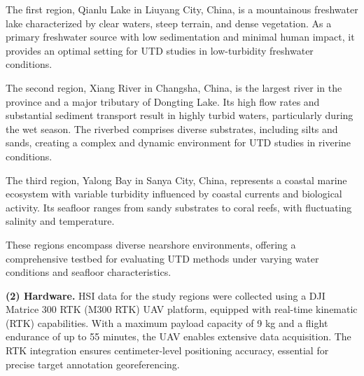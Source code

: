 The first region, Qianlu Lake in Liuyang City, China, is a mountainous freshwater lake characterized by clear waters, steep terrain, and dense vegetation.  
As a primary freshwater source with low sedimentation and minimal human impact, it provides an optimal setting for UTD studies in low-turbidity freshwater conditions.  
\par
The second region, Xiang River in Changsha, China, is the largest river in the province and a major tributary of Dongting Lake.  
Its high flow rates and substantial sediment transport result in highly turbid waters, particularly during the wet season.  
The riverbed comprises diverse substrates, including silts and sands, creating a complex and dynamic environment for UTD studies in riverine conditions.  
\par
The third region, Yalong Bay in Sanya City, China, represents a coastal marine ecosystem with variable turbidity influenced by coastal currents and biological activity.  
Its seafloor ranges from sandy substrates to coral reefs, with fluctuating salinity and temperature.    
\par
These regions encompass diverse nearshore environments, offering a comprehensive testbed for evaluating UTD methods under varying water conditions and seafloor characteristics.  
\par
\textbf{(2) Hardware.} HSI data for the study regions were collected using a DJI Matrice 300 RTK (M300 RTK) UAV platform, equipped with real-time kinematic (RTK) capabilities.  
With a maximum payload capacity of 9 kg and a flight endurance of up to 55 minutes, the UAV enables extensive data acquisition. The RTK integration ensures centimeter-level positioning accuracy, essential for precise target annotation georeferencing.  
